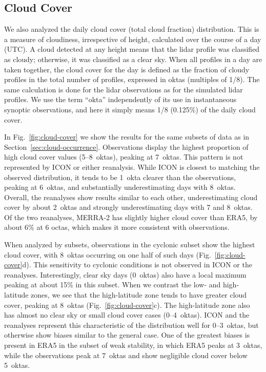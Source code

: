 \documentclass[draft]{agujournal2019}
\begin{document}
\subsection{Cloud Cover}
\label{sec:cloud-cover}

We also analyzed the daily cloud cover (total cloud fraction) distribution. This is a measure of cloudiness, irrespective of height, calculated over the course of a day (UTC). A cloud detected at any height means that the lidar profile was classified as cloudy; otherwise, it was classified as a clear sky. When all profiles in a day are taken together, the cloud cover for the day is defined as the fraction of cloudy profiles in the total number of profiles, expressed in oktas (multiples of 1/8). The same calculation is done for the lidar observations as for the simulated lidar profiles. We use the term ``okta'' independently of its use in instantaneous synoptic observations, and here it simply means 1/8 (0.125\%) of the daily cloud cover.

In Fig.~\ref{fig:cloud-cover} we show the results for the same subsets of data as in Section~\ref{sec:cloud-occurrence}. Observations display the highest proportion of high cloud cover values (5--8~oktas), peaking at 7~oktas. This pattern is not represented by ICON or either reanalysis. While ICON is closest to matching the observed distribution, it tends to be 1~okta clearer than the observations, peaking at 6~oktas, and substantially underestimating days with 8~oktas. Overall, the reanalyses show results similar to each other, underestimating cloud cover by about 2~oktas and strongly underestimating days with 7 and 8~oktas. Of the two reanalyses, MERRA-2 has slightly higher cloud cover than ERA5, by about 6\% at 6 octas, which makes it more consistent with observations.

When analyzed by subsets, observations in the cyclonic subset show the highest cloud cover, with 8~oktas occurring on one half of such days (Fig.~\ref{fig:cloud-cover}d). This sensitivity to cyclonic conditions is not observed in ICON or the reanalyses. Interestingly, clear sky days (0~oktas) also have a local maximum peaking at about 15\% in this subset. When we contrast the low- and high-latitude zones, we see that the high-latitude zone tends to have greater cloud cover, peaking at 8~oktas (Fig.~\ref{fig:cloud-cover}c). The high-latitude zone also has almost no clear sky or small cloud cover cases (0--4~oktas). ICON and the reanalyses represent this characteristic of the distribution well for 0--3~oktas, but otherwise show biases similar to the general case. One of the greatest biases is present in ERA5 in the subset of weak stability, in which ERA5 peaks at 3~oktas, while the observations peak at 7~oktas and show negligible cloud cover below 5~oktas.
\end{document}
